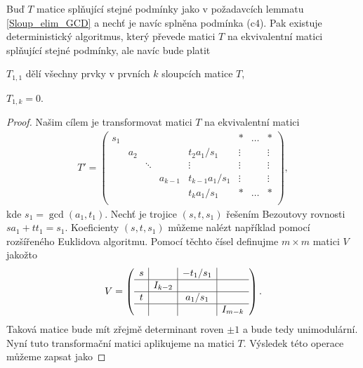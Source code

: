\begin{lem} \label{Sloup_elim_SNF}
Buď $ T $ matice splňující stejné podmínky jako v požadavcích lemmatu \ref{Sloup_elim_GCD}
a nechť je navíc splněna podmínka (c4). Pak existuje deterministický
algoritmus, který převede matici $ T $ na ekvivalentní matici splňující stejné
podmínky, ale navíc bude platit
\begin{Cond}[resume=Sloup_elim_CONDS]
    \item $ T_{1,1} $ dělí všechny prvky v prvních $ k $ sloupcích matice $ T $,
    \item $ T_{1,k} = 0 $.
\end{Cond}
\end{lem}
\begin{proof}
Našim cílem je transformovat matici $ T $ na ekvivalentní matici
\begin{align*}
T' =
    \left(
    \begin{array}{ccccc|ccc}
        s_1 &     &        &         &                 & \ast   & \hdots & \ast   \\
            & a_2 &        &         & t_2 a_1/s_1     & \vdots &        & \vdots \\
            &     & \ddots &         & \vdots          & \vdots &        & \vdots \\
            &     &        & a_{k-1} & t_{k-1} a_1/s_1 & \vdots &        & \vdots \\
            &     &        &         & t_k a_1/s_1     & \ast   & \hdots & \ast \\
    \end{array}
    \right),
\end{align*}
kde $ s_1 = \gcd(a_1, t_1) $. Nechť je trojice $ (s, t, s_1) $ řešením Bezoutovy
rovnosti $ s a_1 + t t_1 = s_1 $. Koeficienty $ (s, t, s_1) $ můžeme nalézt
například pomocí rozšířeného Euklidova algoritmu.
Pomocí těchto čísel definujme $ m \times m $ matici $ V $ jakožto
\begin{align*}
V =
    \left(
    \begin{array}{c|c|c|c}
      s      &         & - t_1 / s_1 &         \\ \hline
             & I_{k-2} &             &         \\ \hline
      t      &         & a_1 / s_1   &         \\ \hline
             &         &             & I_{m-k} \\
    \end{array}
    \right)
.
\end{align*}
Taková matice bude mít zřejmě determinant roven $ \pm 1 $ a bude tedy
unimodulární. Nyní tuto transformační matici aplikujeme na matici $ T $.
Výsledek této operace můžeme zapsat jako


\end{proof}
